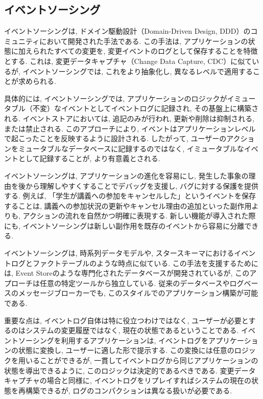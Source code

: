 \documentclass[../../../main]{subfiles}
\begin{document}
    \subsection{イベントソーシング}\label{subsec:phraseology-event_sourcing}
    イベントソーシングは, ドメイン駆動設計（Domain-Driven Design, DDD）のコミュニティにおいて開発された手法である. この手法は, アプリケーションの状態に加えられたすべての変更を, 変更イベントのログとして保存することを特徴とする. これは, 変更データキャプチャ（Change Data Capture, CDC）に似ているが, イベントソーシングでは, これをより抽象化し, 異なるレベルで適用することが求められる.

    具体的には, イベントソーシングでは, アプリケーションのロジックがイミュータブル（不変）なイベントとしてイベントログに記録され, その基盤上に構築される. イベントストアにおいては, 追記のみが行われ, 更新や削除は抑制される, または禁止される. このアプローチにより, イベントはアプリケーションレベルで起こったことを反映するように設計される. したがって, ユーザーのアクションをミュータブルなデータベースに記録するのではなく, イミュータブルなイベントとして記録することが, より有意義とされる.

    イベントソーシングは, アプリケーションの進化を容易にし, 発生した事象の理由を後から理解しやすくすることでデバッグを支援し, バグに対する保護を提供する. 例えば, 「学生が講義への参加をキャンセルした」というイベントを保存することは, 講義への参加状況の更新やキャンセル理由の追加といった副作用よりも, アクションの流れを自然かつ明確に表現する. 新しい機能が導入された際にも, イベントソーシングは新しい副作用を既存のイベントから容易に分離できる.

    イベントソーシングは, 時系列データモデルや, スタースキーマにおけるイベントログとファクトテーブルのような時点に似ている. この手法を支援するためには, Event Storeのような専門化されたデータベースが開発されているが, このアプローチは任意の特定ツールから独立している. 従来のデータベースやログベースのメッセージブローカーでも, このスタイルでのアプリケーション構築が可能である.

    重要な点は, イベントログ自体は特に役立つわけではなく, ユーザーが必要とするのはシステムの変更履歴ではなく, 現在の状態であるということである. イベントソーシングを利用するアプリケーションは, イベントログをアプリケーションの状態に変換し, ユーザーに適した形で提示する. この変換には任意のロジックを用いることができるが, 一貫してイベントログから同じアプリケーションの状態を導出できるように, このロジックは決定的であるべきである. 変更データキャプチャの場合と同様に, イベントログをリプレイすればシステムの現在の状態を再構築できるが, ログのコンパクションは異なる扱いが必要である.
\end{document}
